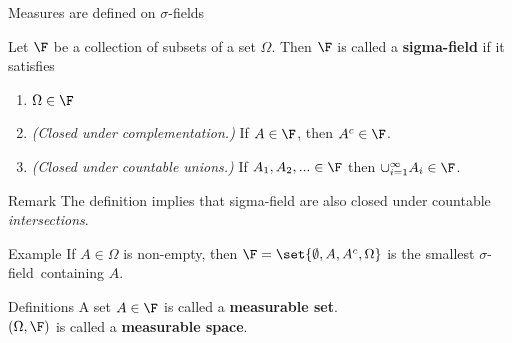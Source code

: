 \documentclass[10pt]{beamer}
\renewcommand{\sf}{$\sigma$-field}
\newcommand{\sfs}{$\sigma$-fields}
\begin{document}
\begin{frame}{Measures are defined on \alert{\sfs}}
\begin{definition}
Let $\F$ be a collection of subsets of a set $\Omega$.  Then $\F$ is called a \textbf{sigma-field}  if it satisfies

\begin{enumerate}
	\item $\Omega \in \F$ 
	\item \textit{(Closed under complementation.)} If $A \in \F$, then $A^c \in \F$.
	\item \textit{(Closed under countable unions.)} If $A_1,A_2, ... \in \F$ then $\cup_{i=1}^\infty A_i \in \F$.  
\end{enumerate}
\end{definition}


%
\pause
\begin{block}{Remark}
The definition implies that sigma-field are also closed under countable \textit{intersections}.	
\end{block}

\pause 
\begin{block}{Example}
If $A \in \Omega$ is non-empty, then $\F = \set{\emptyset, A, A^c, \Omega}$ is the smallest \sf\ containing $A$.
\end{block}


%	

\pause 
\begin{block}{Definitions}
A set $A \in \F$ is called a \textbf{measurable set}.\\
$(\Omega, \F)$ is called a \textbf{measurable space}.	
\end{block}


\end{frame}
\end{document}
